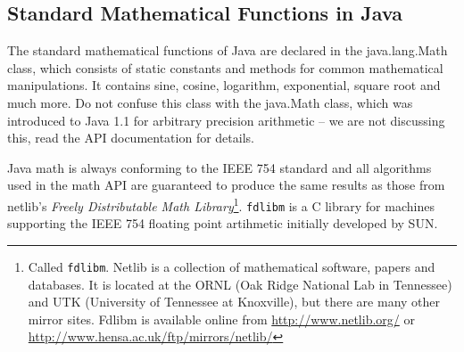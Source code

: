 \subsection{Standard Mathematical Functions in Java}
\label{sec:Standard_Math}

The standard mathematical functions of Java are declared in the 
java.lang.Math class, which consists of static constants and methods
for common mathematical manipulations. 
It contains sine, cosine, logarithm, exponential,
square root and much more. Do not confuse this class with the
java.Math class, which was introduced to Java 1.1 for arbitrary
precision arithmetic -- we are not discussing this, read the
API documentation for details.

Java math is always conforming to the IEEE 754 standard and all
algorithms used in the math API are guaranteed to produce the
same results as those from netlib's 
\emph{Freely Distributable Math Library}\footnote{Called \texttt{fdlibm}.
Netlib is a collection of mathematical software, papers and databases.
It is located at the ORNL (Oak Ridge National Lab in Tennessee) and UTK (University
of Tennessee at Knoxville), but there are many other mirror sites.
Fdlibm is available online from 
\href{http://www.netlib.org/}{http://www.netlib.org/} or
\href{http://www.hensa.ac.uk/ftp/mirrors/netlib/}%
           {http://www.hensa.ac.uk/ftp/mirrors/netlib/}}.
\verb|fdlibm| is a C library for machines supporting the IEEE 754 floating
point artihmetic initially developed by SUN.

